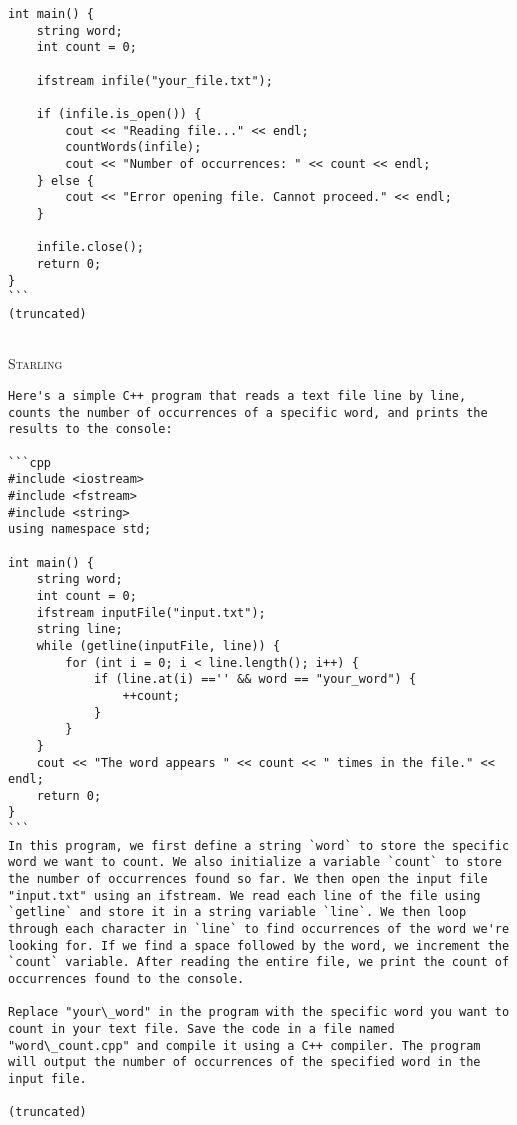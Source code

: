 \documentclass{article}
\newlength\mydepth
\newcommand{\starlingemojititle}{\textsc{Starling}\raisebox{-\mydepth}{\texttt{[image: images/starling-final.png]}}}
\begin{document}
{\begin{lstlisting}[upquote=true]
int main() {
    string word;
    int count = 0;

    ifstream infile("your_file.txt");

    if (infile.is_open()) {
        cout << "Reading file..." << endl;
        countWords(infile);
        cout << "Number of occurrences: " << count << endl;
    } else {
        cout << "Error opening file. Cannot proceed." << endl;
    }

    infile.close();
    return 0;
}
```
(truncated)
\end{lstlisting}
\begin{tabular}{c|c}
\midrule
\end{tabular}
\newpage
\starlingemojititle{} 
\begin{lstlisting}[upquote=true]
Here's a simple C++ program that reads a text file line by line, counts the number of occurrences of a specific word, and prints the results to the console:   

```cpp                                         
#include <iostream>
#include <fstream>
#include <string>                                              
using namespace std;

int main() {
    string word;
    int count = 0;
    ifstream inputFile("input.txt");
    string line;
    while (getline(inputFile, line)) {
        for (int i = 0; i < line.length(); i++) {
            if (line.at(i) =='' && word == "your_word") {
                ++count;
            }
        }
    }
    cout << "The word appears " << count << " times in the file." << endl;
    return 0;
}
```
In this program, we first define a string `word` to store the specific word we want to count. We also initialize a variable `count` to store the number of occurrences found so far. We then open the input file "input.txt" using an ifstream. We read each line of the file using `getline` and store it in a string variable `line`. We then loop through each character in `line` to find occurrences of the word we're looking for. If we find a space followed by the word, we increment the `count` variable. After reading the entire file, we print the count of occurrences found to the console.

Replace "your\_word" in the program with the specific word you want to count in your text file. Save the code in a file named "word\_count.cpp" and compile it using a C++ compiler. The program will output the number of occurrences of the specified word in the input file.

(truncated)
\end{lstlisting}
 
}
\end{document}
